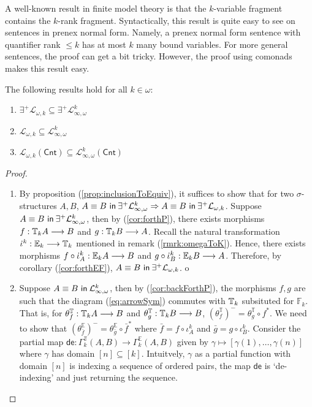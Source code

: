 A well-known result in finite model theory is that the $k$-variable fragment contains the $k$-rank fragment. Syntactically, this result is quite easy to see on sentences in prenex normal form. Namely, a prenex normal form sentence with quantifier rank $\leq k$ has at most $k$ many bound variables. For more general sentences, the proof can get a bit tricky. However, the proof using comonads makes this result easy. 
\begin{prop} The following results hold for all $k \in \omega$:
\begin{enumerate}[label=(\arabic*)]
\item $\exists^{+}\mathcal{L}_{\omega,k} \subseteq \exists^{+}\mathcal{L}^{k}_{\infty,\omega}$
\item $\mathcal{L}_{\omega,k} \subseteq \mathcal{L}^{k}_{\infty,\omega}$
\item $\mathcal{L}_{\omega,k}(\mathsf{Cnt}) \subseteq \mathcal{L}^{k}_{\infty,\omega}(\mathsf{Cnt})$
\end{enumerate}
\begin{proof}
\begin{enumerate}[label=(\arabic*)]
\item By proposition (\ref{prop:inclusionToEquiv}), it suffices to show that for two $\sigma$-structures $A,B$, ${A \equiv B \ \mathsf{in}\: \exists^{+}\mathcal{L}^{k}_{\infty,\omega}} \Rightarrow {A \equiv B \ \mathsf{in}\: \exists^{+}\mathcal{L}_{\omega,k}}$. Suppose ${A \equiv B \ \mathsf{in}\: \exists^{+}\mathcal{L}^{k}_{\infty,\omega}} $, then by (\ref{cor:forthP}), there exists morphisms $f:{\mathbb{T}_{k}A} \longrightarrow B$ and $g:{\mathbb{T}_{k}B} \longrightarrow A$. Recall the natural transformation $\iota^{k}:\efcomonad{k}{} \longrightarrow \pcomonad{k}{}$ mentioned in remark (\ref{rmrk:omegaToK}). Hence, there exists morphisms $f \circ \iota^{k}_{A}:\efcomonad{k}{A} \longrightarrow B$ and $g \circ \iota^{k}_{B}:\efcomonad{k}{B} \longrightarrow A$. Therefore, by corollary (\ref{cor:forthEF}), ${A \equiv B \ \mathsf{in}\: \exists^{+}\mathcal{L}_{\omega,k}}$.
o
\item Suppose ${A \equiv B \ \mathsf{in}\: \mathcal{L}^{k}_{\infty,\omega}}$, then by (\ref{cor:backForthP}), the morphisms $f,g$ are such that the diagram (\ref{eq:arrowSym}) commutes with ${\mathbb{T}_{k}}$ subsituted for $\mathbb{F}_{k}$. That is, for $\theta^{\mathbb{T}}_{f}:{\mathbb{T}_{k}A} \longrightarrow B$ and $\theta^{\mathbb{T}}_{g}:{\mathbb{T}_{k}B} \longrightarrow B$, $(\theta^{\mathbb{T}}_{f})^{-} = \theta^{\mathbb{T}}_{g} \circ f^{*}$. We need to show that $(\theta^{\mathbb{E}}_{\bar{f}})^{-} = \theta^{\mathbb{E}}_{\bar{g}} \circ \bar{f}^{*}$ where $\bar{f} = f \circ \iota^{k}_{A}$ and $\bar{g} = g \circ \iota^{k}_{B}$. Consider the partial map $\mathsf{de}:\Gamma^{\mathbb{T}}_{k}(A,B) \longrightarrow \Gamma^{\mathbb{E}}_{k}(A,B)$ given by $\gamma \mapsto [\gamma(1),\dots,\gamma(n)]$ where $\gamma$ has domain $[n] \subseteq [k]$. Intuitvely, $\gamma$ as a partial function with domain $[n]$ is indexing a sequence of ordered pairs, the map $\mathsf{de}$ is `de-indexing' and just returning the sequence. \\

\end{enumerate}
\end{proof}
\end{prop}
